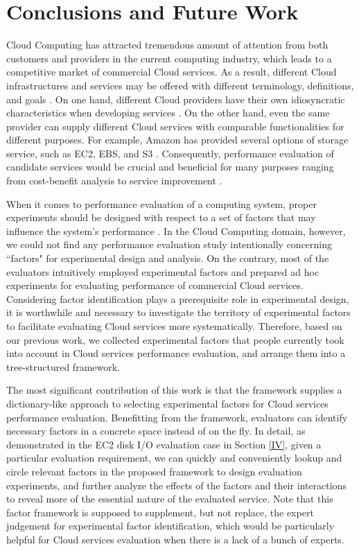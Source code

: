 \documentclass[10pt, conference, compsocconf]{IEEEtran}
\begin{document}
\section{Conclusions and Future Work}
\label{V}
Cloud Computing has attracted tremendous amount of attention from both customers and providers in the current computing industry, which leads to a competitive market of commercial Cloud services. As a result, different Cloud infrastructures and services may be offered with different terminology, definitions, and goals \cite{Prodan_Ostermann_2009}. On one hand, different Cloud providers have their own idiosyncratic characteristics when developing services \cite{Li_Yang_2010}. On the other hand, even the same provider can supply different Cloud services with comparable functionalities for different purposes. For example, Amazon has provided several options of storage service, such as EC2, EBS, and S3 \cite{Chiu_Agrawal_2010}. Consequently, performance evaluation of candidate services would be crucial and beneficial for many purposes ranging from cost-benefit analysis to service improvement \cite{Li_Yang_2010}.

When it comes to performance evaluation of a computing system, proper experiments should be designed with respect to a set of factors that may influence the system's performance \cite{Jain_1991}. In the Cloud Computing domain, however, we could not find any performance evaluation study intentionally concerning ``factors" for experimental design and analysis. On the contrary, most of the evaluators intuitively employed experimental factors and prepared ad hoc experiments for evaluating performance of commercial Cloud services. Considering factor identification plays a prerequisite role in experimental design, it is worthwhile and necessary to investigate the territory of experimental factors to facilitate evaluating Cloud services more systematically. Therefore, based on our previous work, we collected experimental factors that people currently took into account in Cloud services performance evaluation, and arrange them into a tree-structured framework.

The most significant contribution of this work is that the framework supplies a dictionary-like approach to selecting experimental factors for Cloud services performance evaluation. Benefitting from the framework, evaluators can identify necessary factors in a concrete space instead of on the fly. In detail, as demonstrated in the EC2 disk I/O evaluation case in Section \ref{IV}, given a particular evaluation requirement, we can quickly and conveniently lookup and circle relevant factors in the proposed framework to design evaluation experiments, and further analyze the effects of the factors and their interactions to reveal more of the essential nature of the evaluated service. Note that this factor framework is supposed to supplement, but not replace, the expert judgement for experimental factor identification, which would be particularly helpful for Cloud services evaluation when there is a lack of a bunch of experts.
\end{document}
